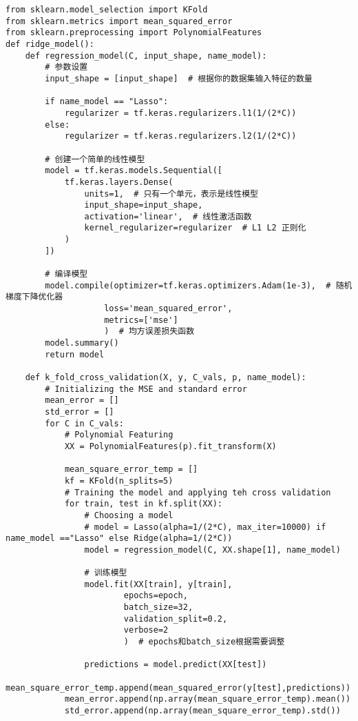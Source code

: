 \begin{lstlisting}
from sklearn.model_selection import KFold
from sklearn.metrics import mean_squared_error
from sklearn.preprocessing import PolynomialFeatures
def ridge_model():
    def regression_model(C, input_shape, name_model):
        # 参数设置
        input_shape = [input_shape]  # 根据你的数据集输入特征的数量

        if name_model == "Lasso":
            regularizer = tf.keras.regularizers.l1(1/(2*C))
        else:
            regularizer = tf.keras.regularizers.l2(1/(2*C))

        # 创建一个简单的线性模型
        model = tf.keras.models.Sequential([
            tf.keras.layers.Dense(
                units=1,  # 只有一个单元，表示是线性模型
                input_shape=input_shape,
                activation='linear',  # 线性激活函数
                kernel_regularizer=regularizer  # L1 L2 正则化
            )
        ])
        
        # 编译模型
        model.compile(optimizer=tf.keras.optimizers.Adam(1e-3),  # 随机梯度下降优化器
                    loss='mean_squared_error',
                    metrics=['mse']
                    )  # 均方误差损失函数
        model.summary()
        return model
            
    def k_fold_cross_validation(X, y, C_vals, p, name_model):
        # Initializing the MSE and standard error
        mean_error = []
        std_error = []
        for C in C_vals:
            # Polynomial Featuring
            XX = PolynomialFeatures(p).fit_transform(X)
                    
            mean_square_error_temp = []
            kf = KFold(n_splits=5)
            # Training the model and applying teh cross validation
            for train, test in kf.split(XX):
                # Choosing a model
                # model = Lasso(alpha=1/(2*C), max_iter=10000) if name_model =="Lasso" else Ridge(alpha=1/(2*C))
                model = regression_model(C, XX.shape[1], name_model)
                
                # 训练模型
                model.fit(XX[train], y[train], 
                        epochs=epoch, 
                        batch_size=32, 
                        validation_split=0.2,
                        verbose=2
                        )  # epochs和batch_size根据需要调整
                
                predictions = model.predict(XX[test])
                mean_square_error_temp.append(mean_squared_error(y[test],predictions))
            mean_error.append(np.array(mean_square_error_temp).mean())
            std_error.append(np.array(mean_square_error_temp).std())


\end{lstlisting}
